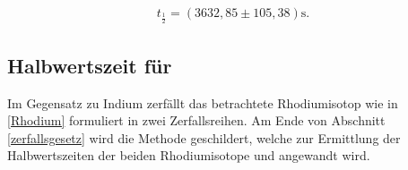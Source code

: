 \begin{align}
 t_{\frac12} = (3632,85 \pm 105,38) \text{s}.
 \label{in}
\end{align}


\subsection{Halbwertszeit für }
Im Gegensatz zu Indium zerfällt das betrachtete Rhodiumisotop wie in \eqref{Rhodium} formuliert in zwei Zerfallsreihen.
Am Ende von Abschnitt \ref{zerfallsgesetz} wird die Methode geschildert, welche zur Ermittlung der Halbwertszeiten der beiden
Rhodiumisotope  und  angewandt wird.

